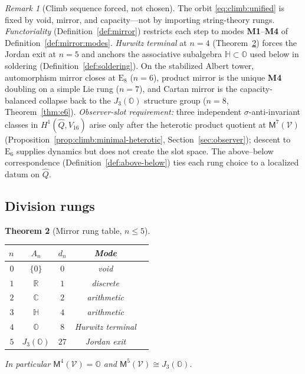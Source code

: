 \documentclass[11pt]{article}
\theoremstyle{plain}
\newtheorem{theorem}{Theorem}[section]
\theoremstyle{definition}
\theoremstyle{remark}
\newtheorem{remark}[theorem]{Remark}
\numberwithin{equation}{section}
\newcommand{\R}{\mathbb{R}}
\newcommand{\C}{\mathbb{C}}
\newcommand{\Quat}{\mathbb{H}}
\newcommand{\Oct}{\mathbb{O}}
\newcommand{\jalg}{J_3(\mathbb{O})}
\newcommand{\E}[1]{\mathrm{E}_{#1}}
\newcommand{\Void}{\mathcal{V}}
\newcommand{\Mirror}{\mathsf{M}}
\begin{document}
\begin{remark}[Climb sequence forced, not chosen]\label{rem:climb:forced}
The orbit \eqref{eq:climb:unified} is fixed by void, mirror, and capacity---not
by importing string-theory rungs. \emph{Functoriality}
(Definition~\ref{def:mirror}) restricts each step to modes
\textbf{M1}--\textbf{M4} of Definition~\ref{def:mirror:modes}. \emph{Hurwitz
terminal} at $n=4$ (Theorem~\ref{thm:rung-table}) forces the Jordan exit at
$n=5$ and anchors the associative subalgebra $\Quat\subset\Oct$ used below in
soldering (Definition~\ref{def:soldering}). On the stabilized Albert tower,
automorphism mirror closes at $\E{8}$ ($n=6$), product mirror is the unique
\textbf{M4} doubling on a simple Lie rung ($n=7$), and Cartan mirror is the
capacity-balanced collapse back to the $\jalg$ structure group ($n=8$,
Theorem~\ref{thm:e6}). \emph{Observer-slot requirement:} three independent
$\sigma$-anti-invariant classes in $H^1(\hat Q,V_{16})$ arise only after the
heterotic product quotient at $\Mirror^7(\Void)$ (Proposition~\ref{prop:climb:minimal-heterotic},
Section~\ref{sec:observer}); descent to $\E{6}$ supplies dynamics but does not
create the slot space. The above--below correspondence
(Definition~\ref{def:above-below}) ties each rung choice to a localized datum on
$\hat Q$.
\end{remark}

\subsection{Division rungs}
\label{sec:climb:division}

\begin{theorem}[Mirror rung table, $n\leq5$]\label{thm:rung-table}
\begin{center}
\renewcommand{\arraystretch}{1.15}
\begin{tabular}{@{}rcccc@{}}
\toprule
$n$ & $A_n$ & $d_n$ & Mode & \\
\midrule
$0$ & $\{0\}$ & $0$ & void & \\
$1$ & $\R$ & $1$ & discrete & \\
$2$ & $\C$ & $2$ & arithmetic & \\
$3$ & $\Quat$ & $4$ & arithmetic & \\
$4$ & $\Oct$ & $8$ & Hurwitz terminal & \\
$5$ & $\jalg$ & $27$ & Jordan exit & \\
\bottomrule
\end{tabular}
\end{center}
In particular $\Mirror^4(\Void)=\Oct$ and $\Mirror^5(\Void)\cong\jalg$.
\end{theorem}
\end{document}
